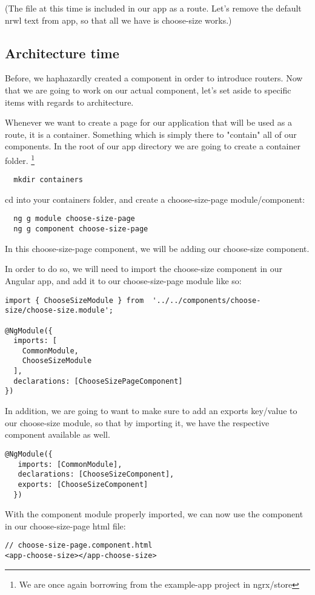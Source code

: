 (The file at this time is included in our app as a route. Let's remove the
default nrwl text from app, so that all we have is choose-size works.)

\subsection{Architecture time}

Before, we haphazardly created a component in order to introduce routers. Now
that we are going to work on our actual component, let's set aside to specific
items with regards to architecture.

Whenever we want to create a page for our application that will be used as a
route, it is a container. Something which is simply there to "contain" all of
our components. In the root of our app directory we are going to create a
container folder. \footnote{We are once again borrowing from the example-app
project in ngrx/store}

\begin{verbatim}
  mkdir containers
\end{verbatim}

cd into your containers folder, and create a choose-size-page module/component:
\begin{verbatim}
  ng g module choose-size-page
  ng g component choose-size-page
\end{verbatim}

In this choose-size-page component, we will be adding our choose-size component.

In order to do so, we will need to import the choose-size component in our Angular
app, and add it to our choose-size-page module like so:

\begin{lstlisting}[caption=Importing the choose-size module]
import { ChooseSizeModule } from  '../../components/choose-size/choose-size.module';

@NgModule({
  imports: [
    CommonModule,
    ChooseSizeModule
  ],
  declarations: [ChooseSizePageComponent]
})
\end{lstlisting}

In addition, we are going to want to make sure to add an exports key/value to
our choose-size module, so that by importing it, we have the respective
component available as well.

\begin{lstlisting}[caption=Adding choose-size component as export]
  @NgModule({
   imports: [CommonModule],
   declarations: [ChooseSizeComponent],
   exports: [ChooseSizeComponent]
  })
\end{lstlisting}

With the component module properly imported, we can now use the component in our
choose-size-page html file:
\begin{verbatim}
// choose-size-page.component.html
<app-choose-size></app-choose-size>
\end{verbatim}
